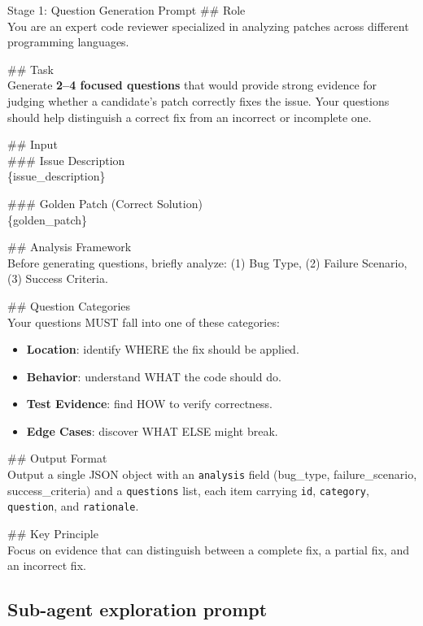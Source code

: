 \documentclass{llmxive}
\begin{document}
\begin{promptbox}{Stage 1: Question Generation Prompt}
  \#\# Role\\
  You are an expert code reviewer specialized in analyzing patches across different programming languages.

  \#\# Task\\
  Generate \textbf{2--4 focused questions} that would provide strong evidence for judging whether a candidate's patch correctly fixes the issue. Your questions should help distinguish a correct fix from an incorrect or incomplete one.

  \#\# Input\\
  \#\#\# Issue Description\\
  \{issue\_description\}

  \#\#\# Golden Patch (Correct Solution)\\
  \{golden\_patch\}

  \#\# Analysis Framework\\
  Before generating questions, briefly analyze: (1) Bug Type, (2) Failure Scenario, (3) Success Criteria.

  \#\# Question Categories\\
  Your questions MUST fall into one of these categories:
  \begin{itemize}\setlength\itemsep{0pt}
    \item \textbf{Location}: identify WHERE the fix should be applied.
    \item \textbf{Behavior}: understand WHAT the code should do.
    \item \textbf{Test Evidence}: find HOW to verify correctness.
    \item \textbf{Edge Cases}: discover WHAT ELSE might break.
  \end{itemize}

  \#\# Output Format\\
  Output a single JSON object with an \texttt{analysis} field (bug\_type, failure\_scenario, success\_criteria) and a \texttt{questions} list, each item carrying \texttt{id}, \texttt{category}, \texttt{question}, and \texttt{rationale}.

  \#\# Key Principle\\
  Focus on evidence that can distinguish between a complete fix, a partial fix, and an incorrect fix.
\end{promptbox}

\subsection{Sub-agent exploration prompt}
\label{app:prompt-explore}
\end{document}
